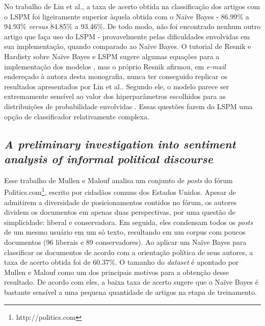 No trabalho de Lin et al., a taxa de acerto obtida na classificação dos artigos com o LSPM foi ligeiramente superior àquela obtida com o Naïve Bayes -  86.99\% a 94.93\% \emph{versus} 84.85\% a 93.46\%. De todo modo, não foi encontrado nenhum outro artigo que faça uso do LSPM - provavelmente pelas dificuldades envolvidas em sua implementação, quando comparado ao Naïve Bayes. O tutorial de Resnik e Hardisty sobre Naïve Bayes e LSPM sugere algumas equações para a implementação dos modelos \cite{resnik}, mas o próprio Resnik afirmou, em \emph{e-mail} endereçado à autora desta monografia, nunca ter conseguido replicar os resultados apresentados por Lin et al.. Segundo ele, o modelo parece ser extremamente sensível ao valor dos hiperparâmetros escolhidos para as distribuições de probabilidade envolvidas \cite{mail-resnik}. Essas questões fazem do LSPM uma opção de classificador relativamente complexa. %

\subsection{\emph{A preliminary investigation into sentiment analysis of informal political discourse}}
\label{sec:aaai}

Esse trabalho de Mullen e Malouf analisa um conjunto de \emph{posts} do fórum Politics.com\footnote{http://politics.com}, escrito por cidadãos comuns dos Estados Unidos. Apesar de admitirem a diversidade de posicionamentos contidos no fórum, os autores dividem os documentos em apenas duas perspectivas, por uma questão de simplicidade: liberal e conservadora. Em seguida, eles condensam todos os \emph{posts} de um mesmo usuário em um só texto, resultando em um corpus com poucos documentos (96 liberais e 89 conservadores). Ao aplicar um Naïve Bayes para classificar os documentos de acordo com a orientação política de seus autores, a taxa de acerto obtida foi de 60.37\%. O tamanho do \emph{dataset} é apontado por Mullen e Malouf como um dos principais motivos para a obtenção desse resultado. De acordo com eles, a baixa taxa de acerto sugere que o Naïve Bayes é bastante sensível a uma pequena quantidade de artigos na etapa de treinamento. 


